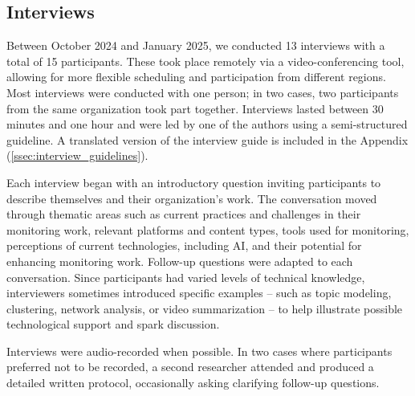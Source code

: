 \documentclass[acmsmall]{acmart}
\begin{document}
\subsection{Interviews}
Between October 2024 and January 2025, we conducted 13 interviews with a total of 15 participants. These took place remotely via a video-conferencing tool, allowing for more flexible scheduling and participation from different regions. Most interviews were conducted with one person; in two cases, two participants from the same organization took part together. Interviews lasted between  30 minutes and one hour and were led by one of the authors using a semi-structured guideline. A translated version of the interview guide is included in the Appendix (\ref{ssec:interview_guidelines}). 

Each interview began with an introductory question inviting participants to describe themselves and their organization's work. The conversation moved through thematic areas such as current practices and challenges in their monitoring work, relevant platforms and content types, tools used for monitoring, perceptions of current technologies, including AI, and their potential for enhancing monitoring work. Follow-up questions were adapted to each conversation. Since participants had varied levels of technical knowledge, interviewers sometimes introduced specific examples -- such as topic modeling, clustering, network analysis, or video summarization -- to help illustrate possible technological support and spark discussion. 

Interviews were audio-recorded when possible. In two cases where participants preferred not to be recorded, a second researcher attended and produced a detailed written protocol, occasionally asking clarifying follow-up questions.
\end{document}
